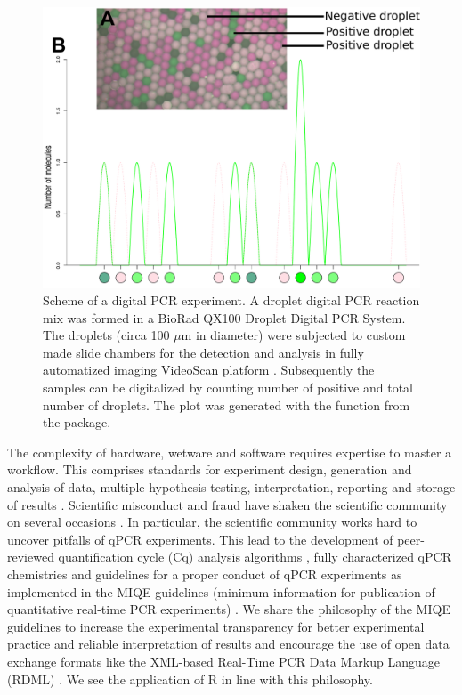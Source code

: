 \begin{figure}[htbp]
  \centering
  \includegraphics[clip=true,trim=0.2cm 0.5cm 0.2cm 0.1cm, width=12cm]{figures/dpcR_sim.pdf} \caption{Scheme 
of a digital PCR experiment.  A droplet digital PCR reaction 
mix was formed in a BioRad QX100 Droplet Digital PCR System. The droplets (circa 
100 $\mu$m in diameter) were subjected to custom made slide chambers for the 
detection and analysis in fully automatized imaging VideoScan platform 
\citep{rodiger_highly_2013}.  Subsequently the samples can be 
digitalized by counting number of positive and total number of droplets. The 
plot was generated with the  function from the  
package.}
\label{figure:dpcR_sim}
\end{figure}

The complexity of hardware, wetware and software requires expertise to master a 
workflow. This comprises standards for experiment design, generation and 
analysis of data, multiple hypothesis testing, interpretation, reporting and 
storage of results \citep{huggett_BDQ_2014, conde_2014}. Scientific misconduct 
and fraud have shaken the scientific community on several occasions 
\citep{bustin_2014}. In particular, the scientific community works hard to 
uncover pitfalls of qPCR experiments. This lead to the development of 
peer-reviewed quantification cycle (Cq) analysis algorithms 
\citep{ruijter_2013}, fully characterized qPCR chemistries \citep{ruijter_2014} 
and guidelines for a proper conduct of qPCR experiments as implemented in the 
MIQE guidelines (minimum information for publication of quantitative real-time 
PCR experiments) \citep{huggett_2013, bustin_2014}. We share the philosophy of 
the MIQE guidelines to increase the experimental transparency for better 
experimental practice and reliable interpretation of results and encourage the 
use of open data exchange formats like the XML-based Real-Time PCR Data Markup 
Language (RDML) \citep{lefever_2009}. We see the application of R in line with 
this philosophy. 

